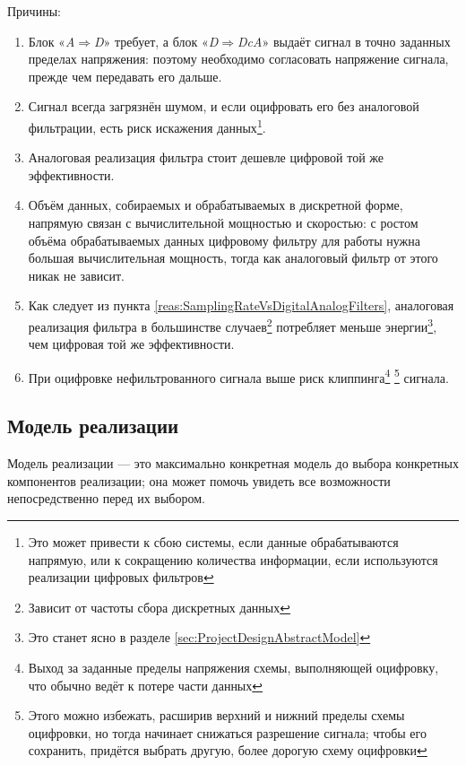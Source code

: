 \documentclass[a4paper, 10pt, final]{article} %
\begin{document}
    \nopagebreak
    \noindent Причины:
    \begin{enumerate}[label=\emph{(\arabic*)}]
        \item Блок «\emph{A$\Rightarrow$D}» требует, а блок «\emph{D$\Rightarrow$DcA}» выдаёт сигнал в точно заданных пределах напряжения: поэтому необходимо согласовать напряжение сигнала, прежде чем передавать его дальше.
        \item Сигнал всегда загрязнён шумом, и если оцифровать его без аналоговой фильтрации, есть риск искажения данных\footnote{Это может привести к сбою системы, если данные обрабатываются напрямую, или к сокращению количества информации, если используются реализации цифровых фильтров}.
        \item Аналоговая реализация фильтра стоит дешевле цифровой той же эффективности.
        \item Объём данных, собираемых и обрабатываемых в дискретной форме, напрямую связан с вычислительной мощностью и скоростью: с ростом объёма обрабатываемых данных цифровому фильтру для работы нужна большая вычислительная мощность, тогда как аналоговый фильтр от этого никак не зависит. \label{reas:SamplingRateVsDigitalAnalogFilters}
        \item Как следует из пункта \ref{reas:SamplingRateVsDigitalAnalogFilters}, аналоговая реализация фильтра в большинстве случаев\footnote{Зависит от частоты сбора дискретных данных} потребляет меньше энергии\footnote{Это станет ясно в разделе \ref{sec:ProjectDesignAbstractModel}}, чем цифровая той же эффективности.
        \item При оцифровке нефильтрованного сигнала выше риск клиппинга\footnote{Выход за заданные пределы напряжения схемы, выполняющей оцифровку, что обычно ведёт к потере части данных} \footnote{Этого можно избежать, расширив верхний и нижний пределы схемы оцифровки, но тогда начинает снижаться разрешение сигнала; чтобы его сохранить, придётся выбрать другую, более дорогую схему оцифровки} сигнала.
    \end{enumerate}

    \subsection{Модель реализации}\label{sec:ProjectDesignImplementationModel}
    Модель реализации --- это максимально конкретная модель до выбора конкретных компонентов реализации; она может помочь увидеть все возможности непосредственно перед их выбором.
\end{document}

